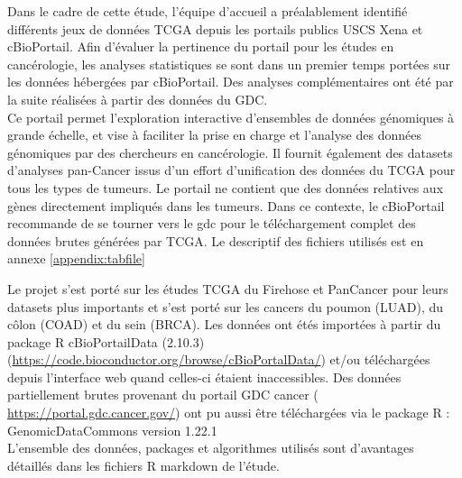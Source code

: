 \documentclass{style}
\begin{document}
Dans le cadre de cette étude, l’équipe d’accueil a préalablement identifié différents jeux de données TCGA depuis les portails publics USCS Xena et cBioPortail. Afin d’évaluer la pertinence du portail pour les études en cancérologie, les analyses statistiques se sont dans un premier temps portées sur les données hébergées par cBioPortail. Des analyses complémentaires ont été par la suite réalisées à partir des données du GDC. \\

Ce portail permet l'exploration interactive d'ensembles de données génomiques à grande échelle, et vise à  faciliter la prise en charge et l'analyse des données génomiques par des chercheurs en cancérologie.
Il fournit également des datasets d'analyses pan-Cancer issus d'un effort d'unification des données du TCGA pour tous les types de tumeurs. Le portail ne contient que des données relatives aux gènes directement impliqués dans les tumeurs. Dans ce contexte, le cBioPortail recommande de se tourner vers le \acrfull{gdc} pour le téléchargement complet des données brutes générées par TCGA. Le descriptif des fichiers utilisés est en annexe \ref{appendix:tabfile}

Le projet s’est porté sur les études TCGA du Firehose et PanCancer pour leurs datasets plus importants et s’est porté sur les cancers du poumon (LUAD), du côlon (COAD) et du sein (BRCA). Les données ont étés importées à partir du package R cBioPortailData (2.10.3) (\hyperlink{https://code.bioconductor.org/browse/cBioPortalData/}{https://code.bioconductor.org/browse/cBioPortalData/}) et/ou téléchargées depuis l’interface web quand celles-ci étaient inaccessibles. Des données partiellement brutes provenant du portail GDC cancer ( \hyperlink{https://portal.gdc.cancer.gov/}{https://portal.gdc.cancer.gov/}) ont pu aussi être téléchargées via le package R : GenomicDataCommons version 1.22.1 \\

L'ensemble des données, packages et algorithmes utilisés sont d’avantages détaillés dans les fichiers R markdown de l’étude. 
\end{document}
